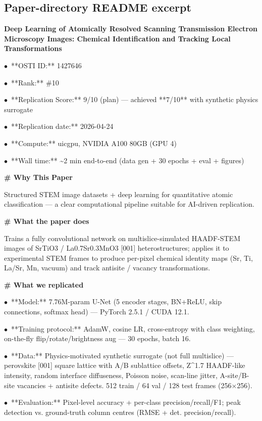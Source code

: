 \documentclass[11pt]{article}
\begin{document}
\subsection*{Paper-directory README excerpt}
\small
\par\medskip\textbf{Deep Learning of Atomically Resolved Scanning Transmission Electron Microscopy Images: Chemical Identification and Tracking Local Transformations}\par
\par$\bullet$\ **OSTI ID:** 1427646
\par$\bullet$\ **Rank:** \#10
\par$\bullet$\ **Replication Score:** 9/10 (plan) — achieved **7/10** with synthetic physics surrogate
\par$\bullet$\ **Replication date:** 2026-04-24
\par$\bullet$\ **Compute:** uicgpu, NVIDIA A100 80GB (GPU 4)
\par$\bullet$\ **Wall time:** \textasciitilde{}2 min end-to-end (data gen + 30 epochs + eval + figures)

\par\medskip\textbf{\# Why This Paper}\par
Structured STEM image datasets + deep learning for quantitative atomic classification — a clear computational pipeline suitable for AI-driven replication.

\par\medskip\textbf{\# What the paper does}\par
Trains a fully convolutional network on multislice-simulated HAADF-STEM images of SrTiO3 / La0.7Sr0.3MnO3 [001] heterostructures; applies it to experimental STEM frames to produce per-pixel chemical identity maps (Sr, Ti, La/Sr, Mn, vacuum) and track antisite / vacancy transformations.

\par\medskip\textbf{\# What we replicated}\par
\par$\bullet$\ **Model:** 7.76M-param U-Net (5 encoder stages, BN+ReLU, skip connections, softmax head) — PyTorch 2.5.1 / CUDA 12.1.
\par$\bullet$\ **Training protocol:** AdamW, cosine LR, cross-entropy with class weighting, on-the-fly flip/rotate/brightness aug — 30 epochs, batch 16.
\par$\bullet$\ **Data:** Physics-motivated synthetic surrogate (not full multislice) — perovskite [001] square lattice with A/B sublattice offsets, Z\textasciicircum{}1.7 HAADF-like intensity, random interface diffuseness, Poisson noise, scan-line jitter, A-site/B-site vacancies + antisite defects. 512 train / 64 val / 128 test frames (256×256).
\par$\bullet$\ **Evaluation:** Pixel-level accuracy + per-class precision/recall/F1; peak detection vs. ground-truth column centres (RMSE + det. precision/recall).
\end{document}
